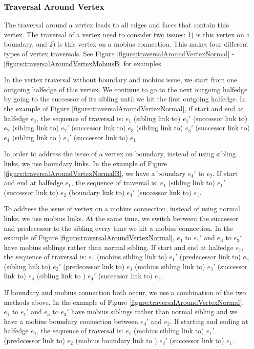 \documentclass[12pt]{article}
\begin{document}
\subsubsection{Traversal Around Vertex}
The traversal around a vertex leads to all edges and faces that contain this vertex. The traversal of a vertex need to consider two issues: 1) is this vertex on a boundary, and  2) is this vertex on a mobius connection. This makes four different types of vertex traversals. See Figure \ref{figure:traversalAroundVertexNormal} - \ref{figure:traversalAroundVertexMobiusB} for examples.

In the vertex traversal without boundary and mobius issue, we start from one outgoing halfedge of this vertex. We continue to go to the next outgoing halfedge by going to the successor of its sibling until we hit the first outgoing halfedge. In the example of Figure \ref{figure:traversalAroundVertexNormal}, if start and end at halfedge $e_1$, the sequence of traversal is: $e_1$ (sibling link to) $e_1'$ (successor link to) $e_2$ (sibling link to) $e_2'$ (successor link to) $e_3$ (sibling link to) $e_3'$ (successor link to) $e_4$ (sibling link to ) $e_4'$  (successor link to)  $e_1$.

In order to address the issue of a vertex on boundary, instead of using sibling links, we use boundary links. In the example of Figure \ref{figure:traversalAroundVertexNormalB}, we have a boundary $e_4'$ to $e_2$. If start and end at halfedge $e_1$, the sequence of traversal is: $e_1$ (sibling link to) $e_1'$ (successor link to) $e_2$ (boundary link to) $e_4'$ (successor link to)  $e_1$.

To address the issue of vertex on a mobius connection, instead of using normal links, we use mobius links. At the same time, we switch between the successor and predecessor to the sibling every time we hit a mobius connection.  In the example of Figure \ref{figure:traversalAroundVertexNormal}, $e_1$ to $e_1'$ and $e_3$ to $e_3'$ have mobius siblings rather than normal sibling. If start and end at halfedge $e_1$, the sequence of traversal is: $e_1$ (mobius sibling link to) $e_1'$ (predecessor link to) $e_2$ (sibling link to) $e_2'$ (predecessor link to) $e_3$ (mobius sibling link to) $e_3'$ (successor link to) $e_4$ (sibling link to ) $e_4'$  (successor link to)  $e_1$.

If boundary and mobius connection both occur, we use a combination of the two methods above. In the example of Figure \ref{figure:traversalAroundVertexNormal}, $e_1$ to $e_1'$ and $e_3$ to $e_3'$ have mobius siblings rather than normal sibling and we have a mobius boundary connection between $e_4'$ and $e_2$. If starting and ending at halfedge $e_1$, the sequence of traversal is: $e_1$ (mobius sibling link to) $e_1'$ (predecessor link to) $e_2$ (mobius boundary link to ) $e_4'$  (successor link to)  $e_1$.
\end{document}

